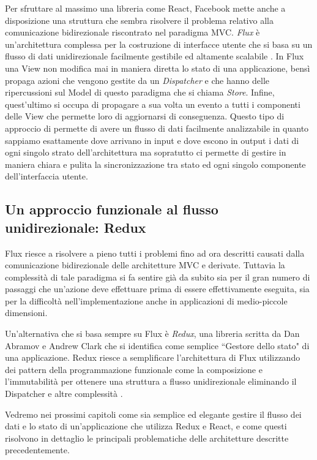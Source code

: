 Per sfruttare al massimo una libreria come React, Facebook mette anche a disposizione una struttura che sembra risolvere il problema relativo alla comunicazione bidirezionale riscontrato nel paradigma MVC. \textit{Flux} è un'architettura complessa per la costruzione di interfacce utente che si basa su un flusso di dati unidirezionale facilmente gestibile ed altamente scalabile \cite{FluxOfficialDocumentation}. In Flux una View non modifica mai in maniera diretta lo stato di una applicazione, bensì propaga azioni che vengono gestite da un \textit{Dispatcher} e che hanno delle ripercussioni sul Model di questo paradigma che si chiama \textit{Store}. Infine, quest'ultimo si occupa di propagare a sua volta un evento a tutti i componenti delle View che permette loro di aggiornarsi di conseguenza. Questo tipo di approccio di permette di avere un flusso di dati facilmente analizzabile in quanto sappiamo esattamente dove arrivano in input e dove escono in output i dati di ogni singolo strato dell'architettura ma sopratutto ci permette di gestire in maniera chiara e pulita la sincronizzazione tra stato ed ogni singolo componente dell'interfaccia utente.

\subsection{Un approccio funzionale al flusso unidirezionale: Redux}
Flux riesce a risolvere a pieno tutti i problemi fino ad ora descritti causati dalla comunicazione bidirezionale delle architetture MVC e derivate. Tuttavia la complessità di tale paradigma si fa sentire già da subito sia per il gran numero di passaggi che un'azione deve effettuare prima di essere effettivamente eseguita, sia per la difficoltà nell'implementazione anche in applicazioni di medio-piccole dimensioni.

Un'alternativa che si basa sempre su Flux è \textit{Redux}, una libreria scritta da Dan Abramov e Andrew Clark che si identifica come semplice “Gestore dello stato" di una applicazione. Redux riesce a semplificare l'architettura di Flux utilizzando dei pattern della programmazione funzionale come la composizione e l'immutabilità per ottenere una struttura a flusso unidirezionale eliminando il Dispatcher e altre complessità \cite{AbramovOnReduxVsFlux}.

Vedremo nei prossimi capitoli come sia semplice ed elegante gestire il flusso dei dati e lo stato di un'applicazione che utilizza Redux e React, e come questi risolvono in dettaglio le principali problematiche delle architetture descritte precedentemente.